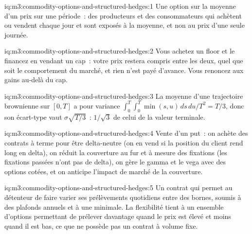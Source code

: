 \begin{solution}{iq:m3:commodity-options-and-structured-hedges:1}
Une option sur la moyenne d'un prix sur une période~: des producteurs et des consommateurs qui achètent ou vendent chaque jour et
sont exposés à la moyenne, et non au prix d'une seule journée.
\end{solution}

\begin{solution}{iq:m3:commodity-options-and-structured-hedges:2}
Vous achetez un floor et le financez en vendant un cap~: votre prix restera compris entre les deux, quel que soit le
comportement du marché, et rien n'est payé d'avance. Vous renoncez aux gains au-delà du cap.
\end{solution}

\begin{solution}{iq:m3:commodity-options-and-structured-hedges:3}
La moyenne d'une trajectoire brownienne sur $[0,T]$ a pour variance $\int_0^T\!\int_0^T \min(s,u)\,ds\,du/T^2 = T/3$,
donc son écart-type vaut $\sigma\sqrt{T/3}$~: $1/\sqrt3$ de celui de la valeur terminale.
\end{solution}

\begin{solution}{iq:m3:commodity-options-and-structured-hedges:4}
Vente d'un put~: on achète des contrats à terme pour être delta-neutre (on en vend si la position du client rend long en delta),
on réduit la couverture au fur et à mesure des fixations (les fixations passées n'ont pas de delta), on gère le gamma et le vega avec des
options cotées, et on anticipe l'impact de marché de la couverture.
\end{solution}

\begin{solution}{iq:m3:commodity-options-and-structured-hedges:5}
Un contrat qui permet au détenteur de faire varier ses prélèvements quotidiens entre des bornes, soumis à des plafonds annuels et à une
 minimale. La flexibilité tient à un ensemble d'options permettant de prélever davantage quand le prix est élevé et moins quand il est
bas, ce que ne possède pas un contrat à volume fixe.
\end{solution}


